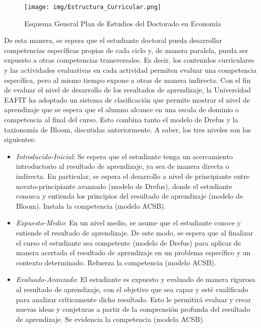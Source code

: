 \begin{figure}[H]
\caption{Esquema General Plan de Estudios del Doctorado en Economía \label{Estructura} }
\begin{center}
\texttt{[image: img/Estructura\_Curricular.png]}
\end{center}
\end{figure}

De esta manera, se espera que el estudiante doctoral pueda desarrollar competencias específicas propias de cada ciclo y, de manera paralela, pueda ser expuesto a otras competencias transversales. Es decir, los contenidos curriculares y las actividades evaluativas en cada actividad permiten evaluar una competencia específica, pero al mismo tiempo expone a otras de manera indirecta.  Con el fin de evaluar el nivel de desarrollo de los resultados de aprendizaje, la Universidad EAFIT ha adoptado un sistema de clasificación que permite mostrar el nivel de aprendizaje que se espera que el alumno alcance en una escala de dominio o competencia al final del curso. Esto combina tanto el modelo de Drefus y la taxionomía de Bloom, discutidas anteriormente. A saber, los tres niveles son los siguientes:

\begin{itemize}
    \item \emph{Introducido-Inicial}: Se espera que el estudiante tenga un acercamiento introductorio al resultado de aprendizaje, ya sea de manera directa o indirecta. En particular, se espera el desarrollo a nivel de principiante entre novato-principiante avanzado (modelo de Drefus), donde el estudiante conozca y entienda los principios del resultado de aprendizaje (modelo de Bloom). Instala la competencia (modelo ACSB).
    \item \emph{Expuesto-Medio}: En un nivel medio, se asume que el estudiante conoce y entiende el resultado de aprendizaje. De este modo, se espera que al finalizar el curso el estudiante sea competente (modelo de Drefus) para aplicar de manera acertada el resultado de aprendizaje en un problema específico y un contexto determinado. Refuerza la competencia (modelo ACSB).
    \item \emph{Evaluado-Avanzado}: El estudiante es expuesto y evaluado de manera rigurosa al resultado de aprendizaje, con el objetivo que sea capaz y esté cualificado para analizar críticamente dicho resultado. Esto le permitirá evaluar y crear nuevas ideas y conjeturas a partir de la comprensión profunda del resultado de aprendizaje. Se evidencia la competencia (modela ACSB).

\end{itemize}


